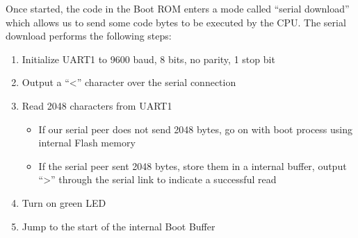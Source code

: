 \documentclass[conference]{IEEEtran}
\newcommand{\nota}[1]{}
\begin{document}
Once started, the code in the Boot ROM enters a mode called 
``serial download'' which allows us to send some code bytes to be executed by the CPU. 
The serial download performs the following steps:

\nota{\begin{enumerate}
\item Se inicializa el UART1 a 9600 baudios, 8 bits, sin paridad, 1 bit de stop.
\item Se envía por esa conexión serie el caracter ``\textgreater''
\item Se leen desde el sistema embebido, 2048 bytes provenientes
de la conexión serie, y se almacenan en una buffer de inicio interno.
\item Decisión:
\begin{itemize}
\item Si el otro extremo de la conexión serie (por ejemplo, nuestra PC) no envía los 2048 bytes, el sistema continúa el proceso de arranque utilizando la memoria interna Flash.
\item Si el extremo de la conexión serie envió los 2048 bytes, entonces se envía desde el sistema (SOC) otro caracter ``\textgreater'' a través de la conexión serie, para indicar que 
se leyeron correctamente.
\end{itemize}
\item Finalmente, la CPU ``salta'' a la dirección del buffer de boot interno,
para continuar leyendo instrucciones desde
los 2048 bytes leídos.
\end{enumerate} } 

\begin{enumerate}
\item Initialize UART1 to 9600 baud, 8 bits, no parity, 1 stop bit
\item Output a ``\textless'' character over the serial connection
\item Read 2048 characters from UART1\nota{, store these in the internal Boot Buffer \nota{ (alias for the Ethernet Mac buffer)}}
\begin{itemize}
	\item If our serial peer does not send 2048 bytes, go on with boot process using internal Flash  memory
	\item If the serial peer sent 2048 bytes, store them in a internal buffer, output ``\textgreater'' through the serial link to indicate a successful read
\end{itemize}
\item Turn on green LED
\item Jump to the start of the internal Boot Buffer
\end{enumerate}
\end{document}
